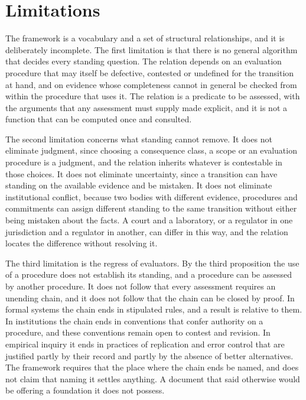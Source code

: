 \section{Limitations}

The framework is a vocabulary and a set of structural relationships, and it is deliberately incomplete. The first limitation is that there is no general algorithm that decides every standing question. The relation depends on an evaluation procedure that may itself be defective, contested or undefined for the transition at hand, and on evidence whose completeness cannot in general be checked from within the procedure that uses it. The relation is a predicate to be assessed, with the arguments that any assessment must supply made explicit, and it is not a function that can be computed once and consulted.

The second limitation concerns what standing cannot remove. It does not eliminate judgment, since choosing a consequence class, a scope or an evaluation procedure is a judgment, and the relation inherits whatever is contestable in those choices. It does not eliminate uncertainty, since a transition can have standing on the available evidence and be mistaken. It does not eliminate institutional conflict, because two bodies with different evidence, procedures and commitments can assign different standing to the same transition without either being mistaken about the facts. A court and a laboratory, or a regulator in one jurisdiction and a regulator in another, can differ in this way, and the relation locates the difference without resolving it.

The third limitation is the regress of evaluators. By the third proposition the use of a procedure does not establish its standing, and a procedure can be assessed by another procedure. It does not follow that every assessment requires an unending chain, and it does not follow that the chain can be closed by proof. In formal systems the chain ends in stipulated rules, and a result is relative to them. In institutions the chain ends in conventions that confer authority on a procedure, and these conventions remain open to contest and revision. In empirical inquiry it ends in practices of replication and error control that are justified partly by their record and partly by the absence of better alternatives. The framework requires that the place where the chain ends be named, and does not claim that naming it settles anything. A document that said otherwise would be offering a foundation it does not possess.


